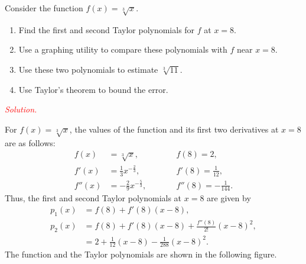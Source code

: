 \documentclass{report}
\begin{document}
    \pagebreak 
    \begin{exm}
        Consider the function $f(x) = \sqrt[3]{x}$.
        \begin{enumerate}[label=(\alph*)]
            \item Find the first and second Taylor polynomials for $f$ at $x=8$.
            \item Use a graphing utility to compare these polynomials with $f$ near $x=8$.
            \item Use these two polynomials to estimate $\sqrt[3]{11}$.
            \item Use Taylor's theorem to bound the error.
        \end{enumerate}
    \end{exm}
    \bigbreak \noindent 
    \textcolor{red}{\textit{Solution.}} 
    \bigbreak \noindent 
    \begin{minipage}[]{0.47\textwidth}
    For $f(x) = \sqrt[3]{x}$, the values of the function and its first two derivatives at $x=8$ are as follows:
    \begin{equation*}
    \begin{alignedat}{2}
        f(x) &= \sqrt[3]{x}, \quad \quad &&f(8) = 2, \\
        f'(x) &= \frac{1}{3}x^{-\frac{2}{3}},  \quad \quad &&f'(8) = \frac{1}{12}, \\
        f''(x) &= -\frac{2}{9}x^{-\frac{5}{3}}, \quad \quad &&f''(8) = -\frac{1}{144}.
    \end{alignedat}
    \end{equation*}
    Thus, the first and second Taylor polynomials at $x=8$ are given by
    \[
    \begin{aligned}
    p_1(x) &= f(8) + f'(8)(x-8), \\
    p_2(x) &= f(8) + f'(8)(x-8) + \frac{f''(8)}{2!}(x-8)^2, \\
           &= 2 + \frac{1}{12}(x-8) - \frac{1}{288}(x-8)^2.
    \end{aligned}
    \]
    The function and the Taylor polynomials are shown in the following figure.
    \end{minipage}
\end{document}
